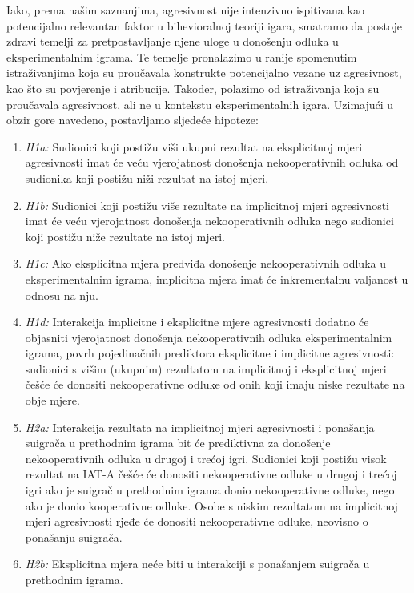 \documentclass[a4paper, 12pt]{report}
\begin{document}
Iako, prema našim saznanjima, agresivnost nije intenzivno ispitivana kao
potencijalno relevantan faktor u bihevioralnoj teoriji igara, smatramo da
postoje zdravi temelji za pretpostavljanje njene uloge u donošenju odluka u
eksperimentalnim igrama. Te temelje pronalazimo u ranije spomenutim
istraživanjima koja su proučavala konstrukte potencijalno vezane uz agresivnost,
kao što su povjerenje i atribucije. Također, polazimo od istraživanja koja su
proučavala agresivnost, ali ne u kontekstu eksperimentalnih igara. Uzimajući u obzir
gore navedeno, postavljamo sljedeće hipoteze:
\begin{enumerate}[label = {}]
        \itemsep0em
        \item \emph{H1a:} Sudionici koji postižu viši ukupni rezultat na eksplicitnoj
            mjeri agresivnosti imat će veću vjerojatnost donošenja nekooperativnih
            odluka od sudionika koji postižu niži rezultat na istoj mjeri.
        \item \emph{H1b:} Sudionici koji postižu više rezultate na implicitnoj
            mjeri agresivnosti imat će veću vjerojatnost donošenja
            nekooperativnih odluka nego sudionici koji postižu niže rezultate na
            istoj mjeri.
        \item \emph{H1c:} Ako eksplicitna mjera predviđa donošenje
            nekooperativnih odluka u eksperimentalnim igrama, implicitna mjera
            imat će inkrementalnu valjanost u odnosu na nju.
        \item \emph{H1d:} Interakcija implicitne i eksplicitne mjere agresivnosti
            dodatno će objasniti vjerojatnost donošenja nekooperativnih odluka
            eksperimentalnim igrama, povrh pojedinačnih prediktora eksplicitne i
            implicitne agresivnosti: sudionici s višim (ukupnim) rezultatom na
            implicitnoj i eksplicitnoj mjeri češće će donositi nekooperativne
            odluke od onih koji imaju niske rezultate na obje mjere. 
        \item \emph{H2a:} Interakcija rezultata na implicitnoj mjeri agresivnosti
            i ponašanja suigrača u prethodnim igrama bit će prediktivna za
            donošenje nekooperativnih odluka u drugoj i trećoj igri. Sudionici koji postižu visok
            rezultat na IAT-A češće će donositi nekooperativne odluke u drugoj i
            trećoj igri ako je
            suigrač u prethodnim igrama donio nekooperativne odluke, nego ako je
            donio kooperativne odluke. Osobe s niskim rezultatom na implicitnoj
            mjeri agresivnosti
            rjeđe će donositi nekooperativne odluke, neovisno o ponašanju
            suigrača. 
        \item \emph{H2b:} Eksplicitna mjera neće biti u interakciji s ponašanjem
            suigrača u prethodnim igrama.
    \end{enumerate}
\end{document}
